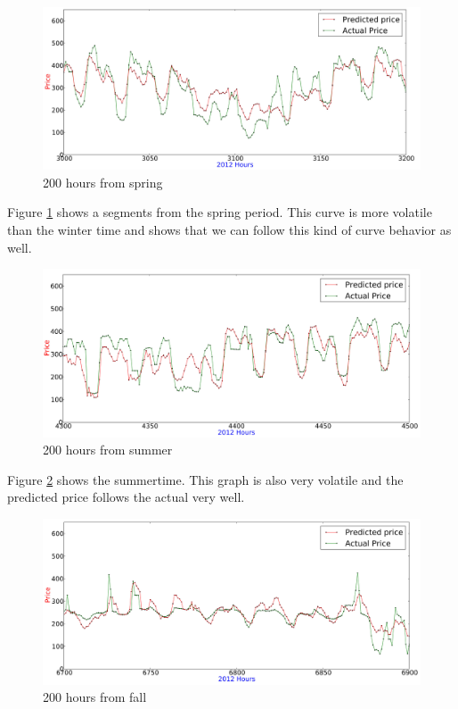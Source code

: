 \begin{figure}[H]
\centering
\includegraphics[width=\linewidth]{billeder/PriceExperimentalAnalysis/spring.jpg}
\caption{200 hours from spring}
\label{fig:Spring}
\end{figure}

Figure \ref{fig:Spring} shows a segments from the spring period. This curve is more volatile than the winter time and shows that we can follow this kind of curve behavior as well.

\begin{figure}[H]
\centering
\includegraphics[width=\linewidth]{billeder/PriceExperimentalAnalysis/summer.jpg}
\caption{200 hours from summer}
\label{fig:Summer}
\end{figure}

Figure \ref{fig:Summer} shows the summertime. This graph is also very volatile and the predicted price follows the actual very well.

\begin{figure}[H]
\centering
\includegraphics[width=\linewidth]{billeder/PriceExperimentalAnalysis/fall.jpg}
\caption{200 hours from fall}
\label{fig:Fall}
\end{figure}

